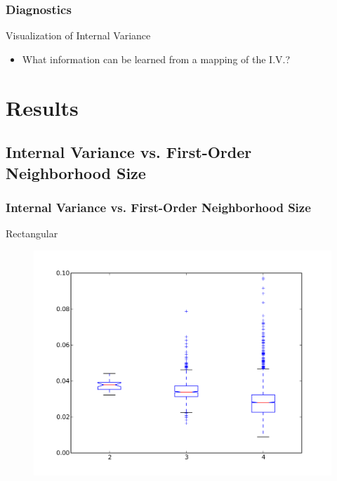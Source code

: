 \documentclass[nototal,handout]{beamer}
\begin{document}
\begin{frame}
	\frametitle{Diagnostics}
 
\begin{block}{Visualization of Internal Variance}
 \begin{itemize}
 \item  What information can be learned from a mapping of the I.V.?
 \end{itemize}
 \end{block} \end{frame} 


\section{Results} 

\subsection{Internal Variance vs. First-Order Neighborhood Size} 

\begin{frame}
	\frametitle{Internal Variance vs. First-Order Neighborhood Size}
 
\begin{block}{Rectangular}
  \begin{center}
  \begin{figure}
  \includegraphics[width=0.75\linewidth]{rook_iv_box.png}
  \end{figure}
  \end{center}
 \end{block} \end{frame} 
\end{document}
